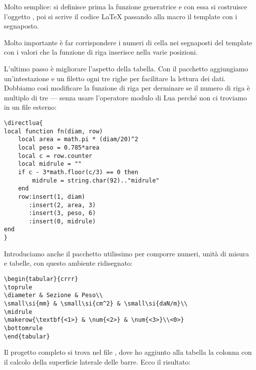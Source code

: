 Molto semplice: si definisce prima la funzione generatrice e con essa si
costruisce l'oggetto , poi si scrive il codice \LaTeX{} passando alla
macro  il template con i segnaposto.

Molto importante è far corrispondere i numeri di cella nei segnaposti del
template con i valori che la funzione di riga inserisce nella varie posizioni.

L'ultimo passo è migliorare l'aspetto della tabella. Con il pacchetto
 aggiungiamo un'intestazione e un filetto ogni tre righe per
facilitare la lettura dei dati. Dobbiamo così modificare la funzione di riga per
derminare se il numero di riga è multiplo di tre --- senza usare l'operatore
modulo \key{\%} di Lua perché non ci troviamo in un file esterno:
\begin{Verbatim}
\directlua{
local function fn(diam, row)
    local area = math.pi * (diam/20)^2
    local peso = 0.785*area
    local c = row.counter
    local midrule = ""
    if c - 3*math.floor(c/3) == 0 then
        midrule = string.char(92).."midrule"
    end
    row:insert(1, diam)
       :insert(2, area, 3)
       :insert(3, peso, 6)
       :insert(0, midrule)
end
}
\end{Verbatim}

Introduciamo anche il pacchetto  utilissimo per comporre numeri,
unità di misura e tabelle, con questo ambiente  ridisegnato:
\begin{Verbatim}
\begin{tabular}{crrr}
\toprule
\diameter & Sezione & Peso\\
\small\si{mm} & \small\si{cm^2} & \small\si{daN/m}\\
\midrule
\makerow{\textbf{<1>} & \num{<2>} & \num{<3>}\\<0>}
\bottomrule
\end{tabular}
\end{Verbatim}

Il progetto completo si trova nel file , dove ho
aggiunto alla tabella la colonna con il calcolo della superficie laterale delle
barre. Ecco il risultato:



